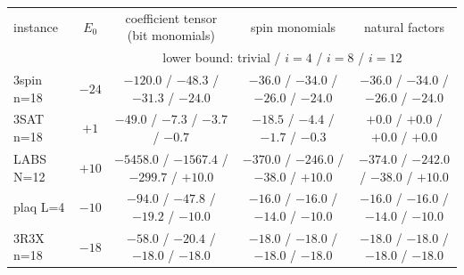 \begin{tabular}{lc ccc}
\toprule
instance & $E_0$ & coefficient tensor (bit monomials) & spin monomials & natural factors \\
& & \multicolumn{3}{c}{lower bound: trivial / $i{=}4$ / $i{=}8$ / $i{=}12$} \\
\midrule
3spin n=18 & $-24$ & $-120.0$ / $-48.3$ / $-31.3$ / $-24.0$ & $-36.0$ / $-34.0$ / $-26.0$ / $-24.0$ & $-36.0$ / $-34.0$ / $-26.0$ / $-24.0$ \\
3SAT n=18 & $+1$ & $-49.0$ / $-7.3$ / $-3.7$ / $-0.7$ & $-18.5$ / $-4.4$ / $-1.7$ / $-0.3$ & $+0.0$ / $+0.0$ / $+0.0$ / $+0.0$ \\
LABS N=12 & $+10$ & $-5458.0$ / $-1567.4$ / $-299.7$ / $+10.0$ & $-370.0$ / $-246.0$ / $-38.0$ / $+10.0$ & $-374.0$ / $-242.0$ / $-38.0$ / $+10.0$ \\
plaq L=4 & $-10$ & $-94.0$ / $-47.8$ / $-19.2$ / $-10.0$ & $-16.0$ / $-16.0$ / $-14.0$ / $-10.0$ & $-16.0$ / $-16.0$ / $-14.0$ / $-10.0$ \\
3R3X n=18 & $-18$ & $-58.0$ / $-20.4$ / $-18.0$ / $-18.0$ & $-18.0$ / $-18.0$ / $-18.0$ / $-18.0$ & $-18.0$ / $-18.0$ / $-18.0$ / $-18.0$ \\
\bottomrule
\end{tabular}